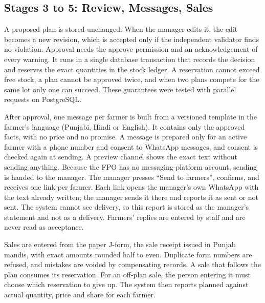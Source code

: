 

\subsection{Stages 3 to 5: Review, Messages, Sales}
\label{sec:method-approval}

A proposed plan is stored unchanged. When the manager edits it, the edit becomes a new revision, which is accepted only if the
independent validator finds no violation. Approval needs the approve permission and an acknowledgement of every warning. It runs in a
single database transaction that records the decision and reserves the exact quantities in the stock ledger. A reservation cannot
exceed free stock, a plan cannot be approved twice, and when two plans compete for the same lot only one can succeed. These guarantees
were tested with parallel requests on PostgreSQL.

After approval, one message per farmer is built from a versioned template in the farmer's language (Punjabi, Hindi or English). It
contains only the approved facts, with no price and no promise. A message is prepared only for an active farmer with a phone number
and consent to WhatsApp messages, and consent is checked again at sending. A preview channel shows the exact text without sending
anything. Because the FPO has no messaging-platform account, sending is handed to the manager. The manager presses ``Send to
farmers'', confirms, and receives one link per farmer. Each link opens the manager's own WhatsApp with the text already written; the
manager sends it there and reports it as sent or not sent. The system cannot see delivery, so this report is stored as the manager's
statement and not as a delivery. Farmers' replies are entered by staff and are never read as acceptance.

Sales are entered from the paper J-form, the sale receipt issued in Punjab mandis, with exact amounts rounded half to even. Duplicate
form numbers are refused, and mistakes are voided by compensating records. A sale that follows the plan consumes its reservation. For
an off-plan sale, the person entering it must choose which reservation to give up. The system then reports planned against actual
quantity, price and share for each farmer.
